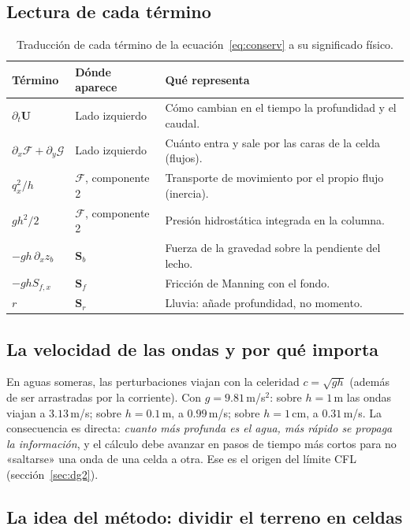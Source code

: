 \documentclass[11pt,a4paper]{article}
\begin{document}
\subsection{Lectura de cada término}

\begin{table}[htbp]
\centering\small
\begin{tabularx}{\linewidth}{p{.24\linewidth}p{.28\linewidth}X}
\toprule
\textbf{Término} & \textbf{Dónde aparece} & \textbf{Qué representa}\\\midrule
$\partial_t\boldsymbol U$ & Lado izquierdo & Cómo cambian en el tiempo la profundidad y el caudal.\\
$\partial_x\mathcal F+\partial_y\mathcal G$ & Lado izquierdo & Cuánto entra y sale por las caras de la celda (flujos).\\
$q_x^2/h$ & $\mathcal F$, componente 2 & Transporte de movimiento por el propio flujo (inercia).\\
$gh^2/2$ & $\mathcal F$, componente 2 & Presión hidrostática integrada en la columna.\\
$-gh\,\partial_xz_b$ & $\boldsymbol S_b$ & Fuerza de la gravedad sobre la pendiente del lecho.\\
$-ghS_{f,x}$ & $\boldsymbol S_f$ & Fricción de Manning con el fondo.\\
$r$ & $\boldsymbol S_r$ & Lluvia: añade profundidad, no momento.\\\bottomrule
\end{tabularx}
\caption{Traducción de cada término de la ecuación~\eqref{eq:conserv} a su significado físico.}
\label{tab:terminos-swe}
\end{table}

\subsection{La velocidad de las ondas y por qué importa}

En aguas someras, las perturbaciones viajan con la celeridad $c=\sqrt{gh}$ (además de ser arrastradas por la
corriente). Con $g=9.81$\,m/s$^2$: sobre $h=1$\,m las ondas viajan a $3.13$\,m/s; sobre $h=0.1$\,m, a $0.99$\,m/s;
sobre $h=1$\,cm, a $0.31$\,m/s. La consecuencia es directa: \emph{cuanto más profunda es el agua, más rápido
se propaga la información}, y el cálculo debe avanzar en pasos de tiempo más cortos para no «saltarse» una
onda de una celda a otra. Ese es el origen del límite CFL (sección~\ref{sec:dg2}).

\subsection{La idea del método: dividir el terreno en celdas}
\end{document}
